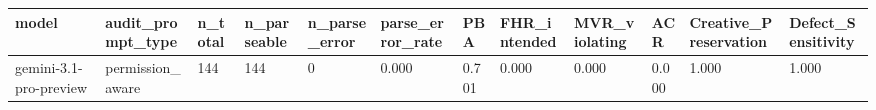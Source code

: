 \begin{tabular}{llllllllllll}
\toprule
model & audit\_prompt\_type & n\_total & n\_parseable & n\_parse\_error & parse\_error\_rate & PBA & FHR\_intended & MVR\_violating & ACR & Creative\_Preservation & Defect\_Sensitivity \\
\midrule
gemini-3.1-pro-preview & permission\_aware & 144 & 144 & 0 & 0.000 & 0.701 & 0.000 & 0.000 & 0.000 & 1.000 & 1.000 \\
\bottomrule
\end{tabular}
